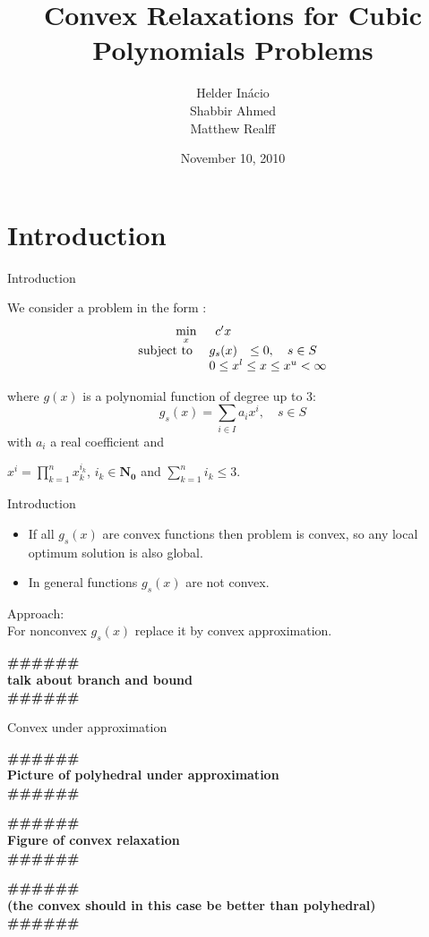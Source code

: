 \documentclass{beamer}
\title{Convex Relaxations for Cubic Polynomials Problems}
\author[In\'acio, Ahmed, Realff]{Helder In\'acio \\ Shabbir Ahmed \\ Matthew Realff}
\date{November 10, 2010}
\institute[GATech]{Georgia Institute of Technology}
\newcommand{\todo}[1]
{\begin{tiny}
  \begin{center} {\color{red}
  \textbf{ {\#\#\#\hfill\#\#\#}\\{#1}\\\#\#\#\hfill\#\#\#}}
\end{center}
\end{tiny}} %
\begin{document}
\begin{frame}
\titlepage
\end{frame}

\section{Introduction}


\begin{frame}{Introduction}

  We consider a problem in the form :
  \begin{displaymath}
    \begin{array}[h]{rcl}
      \min\limits_x & c'x & \\
      \text{subject to } & g_s(x) & \leq 0 , \quad s \in S\\
      & \multicolumn{2}{l}{ 0 \leq x^l \leq x \leq x^u < \infty} \\
    \end{array}
  \end{displaymath}

where $g(x)$ is a polynomial function of degree up to 3:
\begin{displaymath}
  g_s(x) = \sum_{i \in I} a_i x^i, \quad s \in S
\end{displaymath}
with $a_i$ a real coefficient and

$x^i = \prod_{k=1}^{n} x_k^{i_k}$, $i_k \in \mathbf{N_0}$ and $\sum_{k=1}^n i_k \leq 3$.

\end{frame}

\begin{frame}{Introduction}

  \begin{itemize}
    \item
  If all $g_s(x)$ are convex functions then problem is convex,
  so any local optimum solution is also global.
  \item
    In general functions $g_s(x)$ are not convex.
  \end{itemize}

  Approach: \\
  For nonconvex $g_s(x)$ replace it by convex approximation.
  \todo{talk about branch and bound}

\end{frame}

\begin{frame}{Convex under approximation }

  \todo{ Picture of polyhedral under approximation}
  \todo{ Figure of convex relaxation }

  \todo{ (the convex should in this case be better than polyhedral)}

\end{frame}
\end{document}
